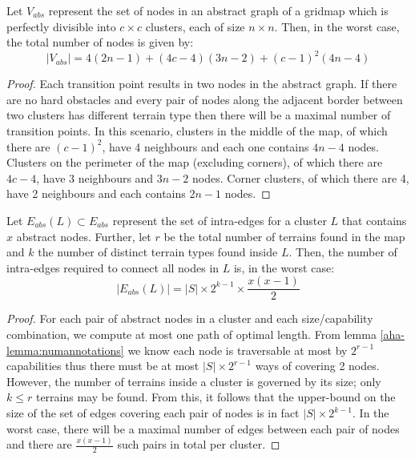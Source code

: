 \begin{lemma}
\label{aha-lemma:maxnodes}
Let $V_{abs}$ represent the set of nodes in an abstract graph of a gridmap which is perfectly divisible into $c \times c$ clusters, each of size $n \times n$. Then, in the worst case, the total number of nodes is given by:
$$|V_{abs}| = 4(2n-1) + (4c - 4)(3n-2) + (c-1)^2(4n-4)$$
\end{lemma}

\begin{proof}
Each transition point results in two nodes in the abstract graph. 
If there are no hard obstacles and every pair of nodes along the adjacent border between two clusters has different terrain type then there will be a maximal number of transition points. 
In this scenario, clusters in the middle of the map, of which there are $(c-1)^2$, have 4 neighbours and each one contains $4n-4$ nodes. 
Clusters on the perimeter of the map (excluding corners), of which there are $4c-4$, have 3 neighbours and $3n-2$ nodes. 
Corner clusters, of which there are 4, have 2 neighbours and each contains $2n-1$ nodes.
\end{proof}

\begin{lemma}
\label{aha-lemma:maxedgesincluster}
Let $E_{abs}(L) \subset E_{abs}$ represent the set of intra-edges for a cluster $L$ that contains $x$ abstract nodes. Further, let $r$ be the total number of terrains found in the map and $k$ the number of distinct terrain types found inside $L$. Then, the number of intra-edges required to connect all nodes in $L$ is, in the worst case:
 $$|E_{abs}(L)| = |S|\times 2^{k-1} \times \frac{x(x-1)}{2}$$
 \end{lemma}

\begin{proof}
For each pair of abstract nodes in a cluster and each size/capability combination, we compute at most one path of optimal length. 
From lemma \ref{aha-lemma:numannotations} we know each node is traversable at most by $2^{r-1}$ capabilities thus there must be at most $|S|\times 2^{r-1}$ ways of covering 2 nodes. 
However, the number of terrains inside a cluster is governed by its size; only $k \leq r$ terrains may be found. 
From this, it follows that the upper-bound on the size of the set of edges covering each pair of nodes is in fact $|S| \times 2^{k-1}$. 
In the worst case, there will be a maximal number of edges between each pair of nodes and there are $\frac{x(x-1)}{2}$ such pairs in total per cluster. 
\end{proof}

